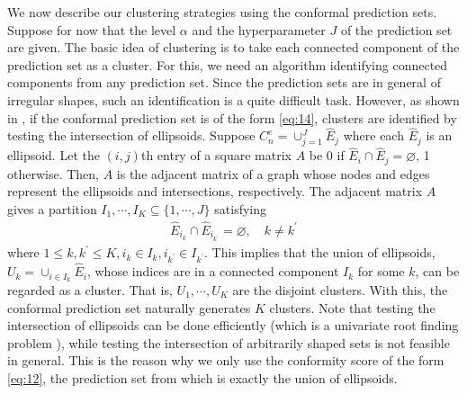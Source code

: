 We now describe our clustering strategies using the conformal prediction sets. Suppose for now that the level $\alpha$ and the hyperparameter $J$ of the prediction set are given. The basic idea of clustering is to take each connected component of the prediction set as a cluster. For this, we need an algorithm identifying connected components from any prediction set. Since the prediction sets are in general of irregular shapes, such an identification is a quite difficult task. However, as shown in \citet{Jung:2021}, if the conformal prediction set is of the form \eqref{eq:14}, clusters are identified by testing the intersection of ellipsoids. Suppose $C_n^e = \cup_{j=1}^J \hat{E}_j$ where each $\hat{E}_j$ is an ellipsoid. Let the $(i,j)$th entry of a square matrix $A$ be 0 if $\hat{E}_i\cap \hat{E}_j=\varnothing$, 1 otherwise. Then, $A$ is the adjacent matrix of a graph whose nodes and edges represent the ellipsoids and intersections, respectively. The adjacent matrix $A$ gives a partition $I_1,\cdots,I_K\subseteq \{1,\cdots,J\}$ satisfying
\begin{align*}
    \hat{E}_{i_k}\cap \hat{E}_{i_{k^\prime}} = \varnothing,\quad k\ne k^\prime
\end{align*}
where $1\le k,k^\prime\le K, i_k\in I_k, i_{k^\prime}\in I_{k^\prime}$. This implies that the union of ellipsoids, $U_k=\cup_{i\in I_k}\hat{E}_i$, whose indices are in a connected component $I_k$ for some $k$, can be regarded as a cluster. That is, $U_1,\cdots,U_K$ are the disjoint clusters. With this, the conformal prediction set naturally generates $K$ clusters. Note that testing the intersection of ellipsoids can be done efficiently (which is a univariate root finding problem \citep{Gilitschenski:2012}), while testing the intersection of arbitrarily shaped sets is not feasible in general. This is the reason why we only use the conformity score of the form \eqref{eq:12}, the prediction set from which is exactly the union of ellipsoids.

